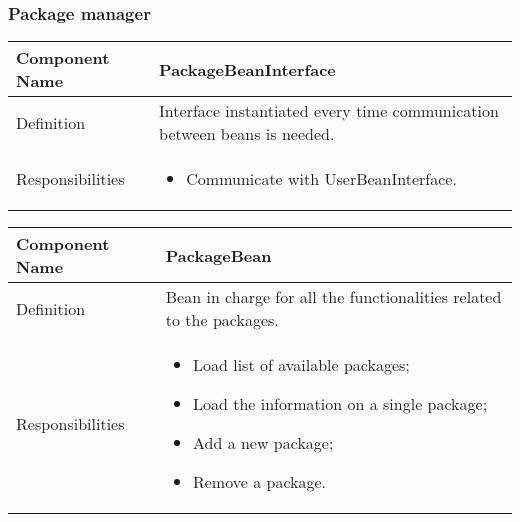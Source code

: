 \documentclass[a4paper,12pt]{book}
\begin{document}
\subsubsection{Package manager}
\begin{center}
  \begin{tabular}{ | p{3.3cm} | p{11.7cm} | }
    \hline
    Component Name & \textbf{PackageBeanInterface} \\ \hline
    Definition & Interface instantiated every time communication between beans is needed. \\ \hline
    Responsibilities & \parbox{0.65\textwidth}{
      \begin{itemize}[noitemsep,leftmargin=*]
        \item Communicate with UserBeanInterface.
      \end{itemize}} \\ \hline
    \end{tabular}
  \end{center}
  \begin{center}
    \begin{tabular}{ | p{3.3cm} | p{11.7cm} | }
      \hline
      Component Name & \textbf{PackageBean} \\ \hline
      Definition & Bean in charge for all the functionalities related to the packages. \\ \hline
      Responsibilities & \parbox{0.65\textwidth}{
        \begin{itemize}[noitemsep,leftmargin=*]
          \item Load list of available packages;
          \item Load the information on a single package;
          \item Add a new package;
          \item Remove a package.
        \end{itemize}} \\ \hline
      \end{tabular}
    \end{center}
\end{document}
